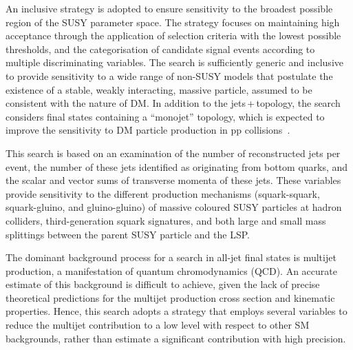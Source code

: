 An inclusive strategy is adopted to ensure sensitivity to the broadest
possible region of the SUSY parameter space. The strategy focuses on
maintaining high acceptance through the application of selection
criteria with the lowest possible thresholds, and the categorisation
of candidate signal events according to multiple discriminating
variables.  The search is sufficiently generic and inclusive to
provide sensitivity to a wide range of non-SUSY %
models that postulate the existence of a stable, weakly interacting,
massive particle, assumed to be consistent with the nature of DM. In
addition to the jets$\,$+$\,$\ptvecmiss topology, the search considers
final states containing a ``monojet'' topology, which is expected to
improve the sensitivity to DM particle production in pp
collisions~\cite{Fox:2012ee, Buchmueller:2015eea}.

This search is based on an examination of the number of reconstructed
jets per event, the number of these jets identified as originating
from bottom quarks, and the scalar and vector sums of transverse
momenta of these jets. These variables provide sensitivity to the
different production mechanisms (squark-squark, squark-gluino, and
gluino-gluino) of massive coloured SUSY particles at hadron colliders,
third-generation squark signatures, and both large and small mass
splittings between the parent SUSY particle and the LSP.

The dominant background process for a search in all-jet final states
is multijet production, a manifestation of quantum chromodynamics
(QCD). An accurate estimate of this background is difficult to
achieve, given the lack of precise theoretical predictions for the
multijet production cross section and kinematic properties. 
Hence, this search adopts a strategy that employs several variables to
reduce the multijet contribution to a low level with respect to other
SM backgrounds, rather than estimate a significant contribution with
high precision.

